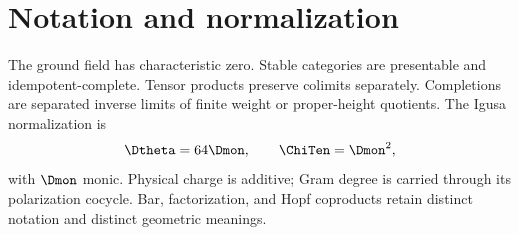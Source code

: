 \documentclass[11pt,twoside,openright]{memoir}
\begin{document}
\chapter*{Notation and normalization}
The ground field has characteristic zero.  Stable categories are presentable and idempotent-complete.  Tensor products preserve colimits separately.  Completions are separated inverse limits of finite weight or proper-height quotients.  The Igusa normalization is
\[
 \Dtheta=64\Dmon,\qquad \ChiTen=\Dmon^2,
\]
with $\Dmon$ monic.  Physical charge is additive; Gram degree is carried through its polarization cocycle.  Bar, factorization, and Hopf coproducts retain distinct notation and distinct geometric meanings.

\tableofcontents
\mainmatter







\backmatter


\end{document}
